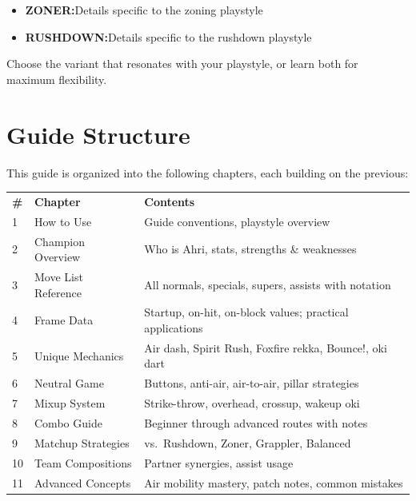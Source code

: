\documentclass[12pt, a4paper]{report}
\newcommand{\zoner}{\textcolor{ahriCyan}{\bfseries\sffamily{\small $\blacktriangleright$} ZONER:}\;}
\newcommand{\rushdown}{\textcolor{ahriMagenta}{\bfseries\sffamily{\small $\blacktriangleright$} RUSHDOWN:}\;}
\begin{document}
\begin{itemize}
  \item \zoner Details specific to the zoning playstyle
  \item \rushdown Details specific to the rushdown playstyle
\end{itemize}

Choose the variant that resonates with your playstyle, or learn both for maximum flexibility.

\section{Guide Structure}

This guide is organized into the following chapters, each building on the previous:

\begin{center}
\begin{tabularx}{\linewidth}{C{0.6cm} L{4.2cm} L{8.8cm}}
\textcolor{ahriCyan}{\textbf{\#}} & \textcolor{ahriCyan}{\textbf{Chapter}} & \textcolor{ahriCyan}{\textbf{Contents}} \\
1 & How to Use & Guide conventions, playstyle overview \\
2 & Champion Overview & Who is Ahri, stats, strengths \& weaknesses \\
3 & Move List Reference & All normals, specials, supers, assists with notation \\
4 & Frame Data & Startup, on-hit, on-block values; practical applications \\
5 & Unique Mechanics & Air dash, Spirit Rush, Foxfire rekka, Bounce!, oki dart \\
6 & Neutral Game & Buttons, anti-air, air-to-air, pillar strategies \\
7 & Mixup System & Strike-throw, overhead, crossup, wakeup oki \\
8 & Combo Guide & Beginner through advanced routes with notes \\
9 & Matchup Strategies & vs.\ Rushdown, Zoner, Grappler, Balanced \\
10 & Team Compositions & Partner synergies, assist usage \\
11 & Advanced Concepts & Air mobility mastery, patch notes, common mistakes \\
\end{tabularx}
\end{center}
\end{document}
